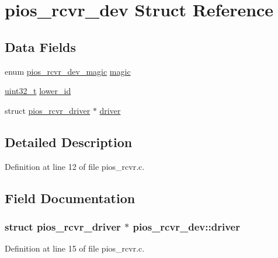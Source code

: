 \hypertarget{structpios__rcvr__dev}{\section{pios\-\_\-rcvr\-\_\-dev Struct Reference}
\label{structpios__rcvr__dev}
}
\subsection*{Data Fields}
\begin{DoxyCompactItemize}
\item 
enum \hyperlink{_common_2pios__rcvr_8c_a11e2b6a532db57920c845a7ea633d783}{pios\-\_\-rcvr\-\_\-dev\-\_\-magic} \hyperlink{structpios__rcvr__dev_aa167293d3d19f1030cc61a2fc386eb66}{magic}
\item 
\hyperlink{stdint_8h_a435d1572bf3f880d55459d9805097f62}{uint32\-\_\-t} \hyperlink{structpios__rcvr__dev_ae6499b31e342e883508673e1503ef9f8}{lower\-\_\-id}
\item 
struct \hyperlink{structpios__rcvr__driver}{pios\-\_\-rcvr\-\_\-driver} $\ast$ \hyperlink{structpios__rcvr__dev_ae0e045c15c6d988c3f15fabd94fc5dd5}{driver}
\end{DoxyCompactItemize}


\subsection{Detailed Description}


Definition at line 12 of file pios\-\_\-rcvr.\-c.



\subsection{Field Documentation}
\hypertarget{structpios__rcvr__dev_ae0e045c15c6d988c3f15fabd94fc5dd5}{
\subsubsection[{driver}]{\setlength{\rightskip}{0pt plus 5cm}struct {\bf pios\-\_\-rcvr\-\_\-driver} $\ast$ pios\-\_\-rcvr\-\_\-dev\-::driver}}\label{structpios__rcvr__dev_ae0e045c15c6d988c3f15fabd94fc5dd5}


Definition at line 15 of file pios\-\_\-rcvr.\-c.

